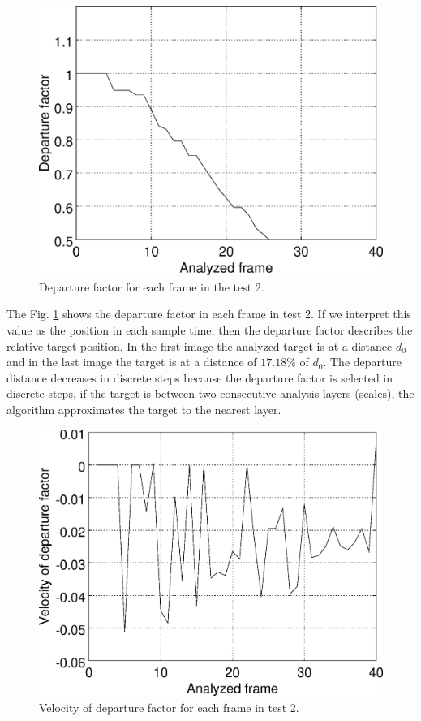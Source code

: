 \begin{figure}[H]
\includegraphics[width=\columnwidth]{images/grapha_b.eps}
\caption{Departure factor for each frame in the test 2.}
\label{fig:res_grapha_b}
\end{figure}

The Fig. \ref{fig:res_grapha_b} shows the departure factor in each frame
in test 2. If we interpret this value as the position in each sample time, 
then the departure factor describes the relative target position.
In the first image the analyzed target is at a distance $d_0$ 
and in the last image the target is at a distance of $17.18\%$ of $d_0$.
The departure distance decreases in discrete steps because the departure
factor is selected in discrete steps, if the target is
between two consecutive analysis layers (scales), the algorithm
approximates the target to the nearest layer.

\begin{figure}[!hbt]
\includegraphics[width=\columnwidth]{images/grapha_bv.eps}
\caption{Velocity of departure factor for each frame in test 2.}
\label{fig:res_grapha_bv}
\end{figure}

